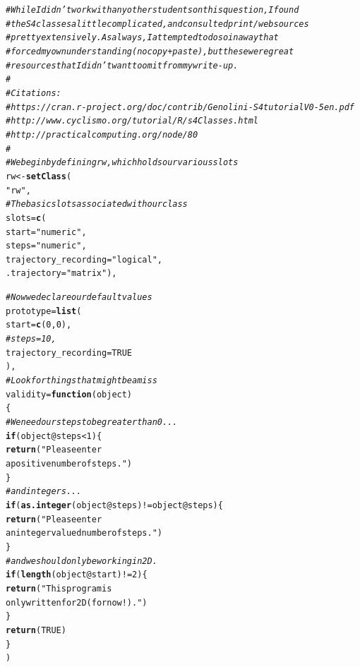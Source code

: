 \documentclass{article}\usepackage[]{graphicx}\usepackage[]{color}
\makeatletter
\newcommand{\hlnum}[1]{\textcolor[rgb]{0.686,0.059,0.569}{#1}}%
\newcommand{\hlstr}[1]{\textcolor[rgb]{0.192,0.494,0.8}{#1}}%
\newcommand{\hlcom}[1]{\textcolor[rgb]{0.678,0.584,0.686}{\textit{#1}}}%
\newcommand{\hlopt}[1]{\textcolor[rgb]{0,0,0}{#1}}%
\newcommand{\hlstd}[1]{\textcolor[rgb]{0.345,0.345,0.345}{#1}}%
\newcommand{\hlkwa}[1]{\textcolor[rgb]{0.161,0.373,0.58}{\textbf{#1}}}%
\newcommand{\hlkwb}[1]{\textcolor[rgb]{0.69,0.353,0.396}{#1}}%
\newcommand{\hlkwc}[1]{\textcolor[rgb]{0.333,0.667,0.333}{#1}}%
\newcommand{\hlkwd}[1]{\textcolor[rgb]{0.737,0.353,0.396}{\textbf{#1}}}%
\newenvironment{kframe}{%
 \def\at@end@of@kframe{}%
 \ifinner\ifhmode%
  \def\at@end@of@kframe{\end{minipage}}%
  \begin{minipage}{\columnwidth}%
 \fi\fi%
 \def\FrameCommand##1{\hskip\@totalleftmargin \hskip-\fboxsep
 \colorbox{shadecolor}{##1}\hskip-\fboxsep
     \hskip-\linewidth \hskip-\@totalleftmargin \hskip\columnwidth}%
 \MakeFramed {\advance\hsize-\width
   \@totalleftmargin\z@ \linewidth\hsize
   \@setminipage}}%
 {\par\unskip\endMakeFramed%
 \at@end@of@kframe}
\newenvironment{knitrout}{}{} %
\makeatother
\begin{document}
\begin{knitrout}
\color{fgcolor}\begin{kframe}
\begin{alltt}
\hlcom{# While I didn't work with any other students on this question, I found}
\hlcom{# the S4 classes a little complicated, and consulted print/web sources}
\hlcom{# pretty extensively.  As always, I attempted to do so in a way that }
\hlcom{# forced my own understanding (no copy + paste), but these were great}
\hlcom{# resources that I didn't want to omit from my write-up.}
\hlcom{#}
\hlcom{# Citations: }
\hlcom{# https://cran.r-project.org/doc/contrib/Genolini-S4tutorialV0-5en.pdf}
\hlcom{# http://www.cyclismo.org/tutorial/R/s4Classes.html}
\hlcom{# http://practicalcomputing.org/node/80}
\hlcom{#}
\hlcom{# We begin by defining rw, which holds our various slots}
\hlstd{rw} \hlkwb{<-} \hlkwd{setClass}\hlstd{(}
  \hlstr{"rw"}\hlstd{,}
  \hlcom{# The basic slots associated with our class}
  \hlkwc{slots} \hlstd{=} \hlkwd{c}\hlstd{(}
    \hlkwc{start} \hlstd{=} \hlstr{"numeric"}\hlstd{,}
    \hlkwc{steps}   \hlstd{=} \hlstr{"numeric"}\hlstd{,}
    \hlkwc{trajectory_recording} \hlstd{=} \hlstr{"logical"}\hlstd{,}
    \hlkwc{.trajectory} \hlstd{=} \hlstr{"matrix"}\hlstd{),}

  \hlcom{# Now we declare our default values}
  \hlkwc{prototype}\hlstd{=}\hlkwd{list}\hlstd{(}
    \hlkwc{start} \hlstd{=} \hlkwd{c}\hlstd{(}\hlnum{0}\hlstd{,}\hlnum{0}\hlstd{),}
    \hlcom{#steps = 10,}
    \hlkwc{trajectory_recording} \hlstd{=} \hlnum{TRUE}
  \hlstd{),}
  \hlcom{# Look for things that might be amiss}
  \hlkwc{validity}\hlstd{=}\hlkwa{function}\hlstd{(}\hlkwc{object}\hlstd{)}
  \hlstd{\{}
    \hlcom{# We need our steps to be greater than 0...}
    \hlkwa{if}\hlstd{(object}\hlopt{@}\hlkwc{steps}\hlopt{<}\hlnum{1}\hlstd{) \{}
      \hlkwd{return}\hlstd{(}\hlstr{"Please enter 
             a positive number of steps."}\hlstd{)}
    \hlstd{\}}
    \hlcom{# and integers...}
    \hlkwa{if}\hlstd{(}\hlkwd{as.integer}\hlstd{(object}\hlopt{@}\hlkwc{steps}\hlstd{)}\hlopt{!=}\hlstd{object}\hlopt{@}\hlkwc{steps}\hlstd{) \{}
      \hlkwd{return}\hlstd{(}\hlstr{"Please enter 
             an integer valued number of steps."}\hlstd{)}
    \hlstd{\}}
    \hlcom{# and we should only be working in 2D.}
    \hlkwa{if}\hlstd{(}\hlkwd{length}\hlstd{(object}\hlopt{@}\hlkwc{start}\hlstd{)}\hlopt{!=}\hlnum{2}\hlstd{) \{}
      \hlkwd{return}\hlstd{(}\hlstr{"This program is
             only written for 2D (for now!)."}\hlstd{)}
    \hlstd{\}}
    \hlkwd{return}\hlstd{(}\hlnum{TRUE}\hlstd{)}
  \hlstd{\}}
\hlstd{)}


\end{alltt}
\end{kframe}
\end{knitrout}
\end{document}
